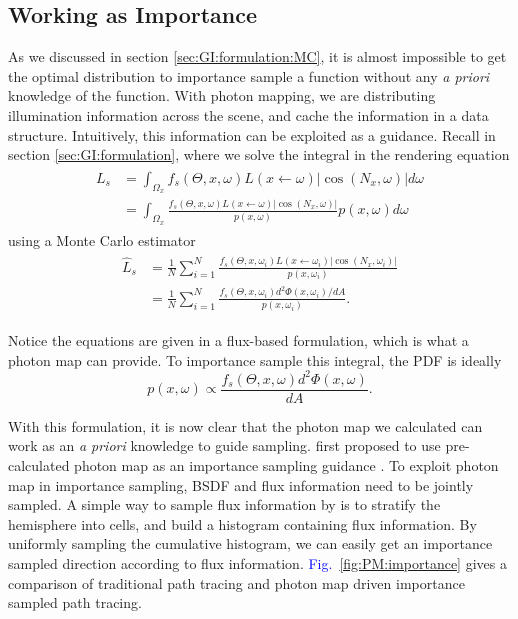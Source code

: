 \documentclass[]{book}
\renewcommand{\figurename}{\textcolor{blue}{Fig.\ }}
\begin{document}
\subsection{Working as Importance}
\label{sec:PM:more:importance}
As we discussed in section \ref{sec:GI:formulation:MC}, it is almost impossible to get the optimal distribution to importance sample a function without any \textit{a priori} knowledge of the function.
With photon mapping, we are distributing illumination information across the scene, and cache the information in a data structure.
Intuitively, this information can be exploited as a guidance.
Recall in section \ref{sec:GI:formulation}, where we solve the integral in the rendering equation
\begin{gather*}
\begin{aligned}
	L_s &= \int_{\Omega_x} f_s(\Theta, x, \omega) L(x \leftarrow \omega) \left| \cos (N_x, \omega) \right| d\omega \\
	&= \int_{\Omega_x} \frac{f_s(\Theta, x, \omega) L(x \leftarrow \omega) \left| \cos (N_x, \omega) \right|}{p(x, \omega)} p(x, \omega) d\omega
\end{aligned}    
\end{gather*}
using a Monte Carlo estimator
\begin{gather*}
\begin{aligned}
	\widehat{L}_s &= \frac{1}{N} \sum_{i=1}^{N} \frac{f_s(\Theta, x, \omega_i) L(x \leftarrow \omega_i) \left| \cos (N_x, \omega_i) \right|}{p(x, \omega_i)}\\
	&= \frac{1}{N} \sum_{i=1}^{N} \frac{f_s(\Theta, x, \omega_i) d^2 \Phi(x, \omega_i) / dA}{p(x, \omega_i)}.
\end{aligned}
\end{gather*}

Notice the equations are given in a flux-based formulation, which is what a photon map can provide.
To importance sample this integral, the PDF is ideally
\begin{equation}
\label{eq:PM:importance}
	p(x, \omega) \propto \frac{f_s(\Theta, x, \omega) d^2 \Phi(x, \omega)}{dA}.
\end{equation}

With this formulation, it is now clear that the photon map we calculated can work as an \textit{a priori} knowledge to guide sampling.
\citeauthor{jensen1995importance} first proposed to use pre-calculated photon map as an importance sampling guidance \cite{jensen1995importance}.
To exploit photon map in importance sampling, BSDF and flux information need to be jointly sampled.
A simple way to sample flux information by \citeauthor{jensen1995importance} is to stratify the hemisphere into cells, and build a histogram containing flux information.
By uniformly sampling the cumulative histogram, we can easily get an importance sampled direction according to flux information.
\figurename \ref{fig:PM:importance} gives a comparison of traditional path tracing and photon map driven importance sampled path tracing.
\end{document}
